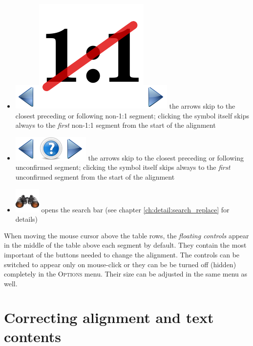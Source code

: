 \documentclass[a4paper,10pt,oneside]{book}
\newcommand{\menu}[1]{\textsc{#1}}
\begin{document}
\begin{itemize}
	\item \includegraphics[height=2ex]{../images/48/go-previous-view.png}\includegraphics[height=2ex]{non11.pdf}\includegraphics[height=2ex]{../images/48/go-next-view.png} the arrows skip to the closest preceding or following non-1:1 segment; clicking the symbol itself skips always to the \emph{first} non-1:1 segment from the start of the alignment
	\item \includegraphics[height=2ex]{../images/48/go-previous-view.png}\includegraphics[height=2ex]{../images/48/unconfirmed.png}\includegraphics[height=2ex]{../images/48/go-next-view.png} the arrows skip to the closest preceding or following unconfirmed segment; clicking the symbol itself skips always to the \emph{first} unconfirmed segment from the start of the alignment
	\item \includegraphics[height=2ex]{../images/48/search.png} opens the search bar (see chapter \ref{ch:detail:search_replace} for details)
\end{itemize}

When moving the mouse cursor above the table rows, the \emph{floating controls} appear in the middle of the table above each segment by default. They contain the most important of the buttons needed to change the alignment. The controls can be switched to appear only on mouse-click or they can be be turned off (hidden) completely in the \menu{Options} menu. Their size can be adjusted in the same menu as well.

\chapter{Correcting alignment and text contents}\label{ch:howto:edit}
\end{document}
